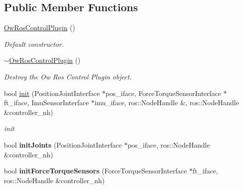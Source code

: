 \subsection*{Public Member Functions}
\begin{DoxyCompactItemize}
\item 
\hyperlink{classow__ros__control__plugin_1_1OwRosControlPlugin_a74161e1bdf98a019d7a1647e803fd1d0}{Ow\+Ros\+Control\+Plugin} ()\hypertarget{classow__ros__control__plugin_1_1OwRosControlPlugin_a74161e1bdf98a019d7a1647e803fd1d0}{}\label{classow__ros__control__plugin_1_1OwRosControlPlugin_a74161e1bdf98a019d7a1647e803fd1d0}

\begin{DoxyCompactList}\small\item\em Default constructor. \end{DoxyCompactList}\item 
\hyperlink{classow__ros__control__plugin_1_1OwRosControlPlugin_a9104f03800c547dfec92a247e77c22c9}{$\sim$\+Ow\+Ros\+Control\+Plugin} ()\hypertarget{classow__ros__control__plugin_1_1OwRosControlPlugin_a9104f03800c547dfec92a247e77c22c9}{}\label{classow__ros__control__plugin_1_1OwRosControlPlugin_a9104f03800c547dfec92a247e77c22c9}

\begin{DoxyCompactList}\small\item\em Destroy the Ow Ros Control Plugin object. \end{DoxyCompactList}\item 
bool \hyperlink{classow__ros__control__plugin_1_1OwRosControlPlugin_a8e5311de05cbc12a6c77e2a595d94e7a}{init} (Position\+Joint\+Interface $\ast$pos\+\_\+iface, Force\+Torque\+Sensor\+Interface $\ast$ft\+\_\+iface, Imu\+Sensor\+Interface $\ast$imu\+\_\+iface, ros\+::\+Node\+Handle \&, ros\+::\+Node\+Handle \&controller\+\_\+nh)
\begin{DoxyCompactList}\small\item\em init \end{DoxyCompactList}\item 
bool {\bfseries init\+Joints} (Position\+Joint\+Interface $\ast$pos\+\_\+iface, ros\+::\+Node\+Handle \&controller\+\_\+nh)\hypertarget{classow__ros__control__plugin_1_1OwRosControlPlugin_af489f14cfc311bd4793f56a9d624f4dd}{}\label{classow__ros__control__plugin_1_1OwRosControlPlugin_af489f14cfc311bd4793f56a9d624f4dd}

\item 
bool {\bfseries init\+Force\+Torque\+Sensors} (Force\+Torque\+Sensor\+Interface $\ast$ft\+\_\+iface, ros\+::\+Node\+Handle \&controller\+\_\+nh)\hypertarget{classow__ros__control__plugin_1_1OwRosControlPlugin_a5c66ae5f223467680182fc8217ab9671}{}\label{classow__ros__control__plugin_1_1OwRosControlPlugin_a5c66ae5f223467680182fc8217ab9671}


\end{DoxyCompactItemize}
